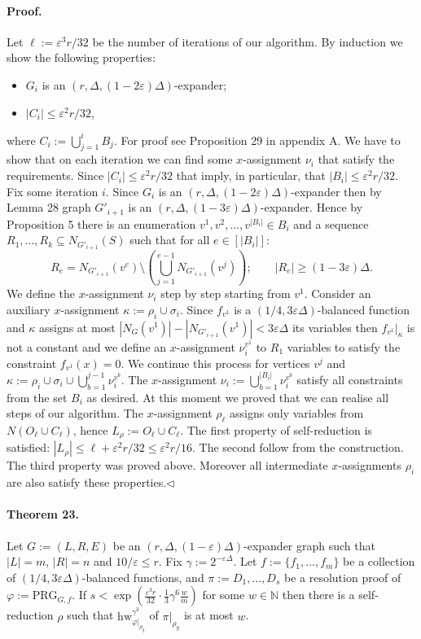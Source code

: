 \paragraph{Proof.} Let $\ell:=\varepsilon^3r/32$ be the number of iterations of our algorithm.
By induction we show the following properties:
\begin{itemize}
\item $G_i$ is an $(r,\Delta,(1-2\varepsilon)\Delta)$-expander;
\item $|C_i|\leq\varepsilon^2r/32$,
\end{itemize}
where $C_i:=\bigcup_{j=1}^iB_j$. For proof see Proposition 29 in appendix A.
We have to show that on each iteration we can find some $x$-assignment $\nu_i$ that satisfy the requirements. Since $|C_i|\leq\varepsilon^2r/32$ that imply, in particular, that $|B_i|\leq\varepsilon^2r/32$.
Fix some iteration $i$. Since $G_i$ is an $(r,\Delta,(1-2\varepsilon)\Delta)$-expander then by Lemma 28 graph $G'_{i+1}$ is an $(r,\Delta,(1-3\varepsilon)\Delta)$-expander. Hence by Proposition 5 there is an enumeration $v^1,v^2,\ldots,v^{|B_i|}\in B_i$ and a sequence $R_1,\ldots,R_k\subseteq N_{G'_{i+1}}(S)$ such that for all $e\in[|B_i|]$:
\[R_e=N_{G'_{i+1}}(v^e)\setminus\left(\bigcup_{j=1}^{e-1}N_{G'_{i+1}}(v^j)\right);\qquad|R_e|\geq(1-3\varepsilon)\Delta.\]
We define the $x$-assignment $\nu_i$ step by step starting from $v^1$. Consider an auxiliary $x$-assignment $\kappa:=\rho_i\cup\sigma_i$. Since $f_{v^1}$ is a $(1/4,3\varepsilon\Delta)$-balanced function and $\kappa$ assigns at most $|N_G(v^1)|-|N_{G'_{i+1}}(v^1)|<3\varepsilon\Delta$ its variables then $f_{v^1}|_\kappa$ is not a constant and we define an $x$-assignment $\nu_i^{v^1}$ to $R_1$ variables to satisfy the constraint $f_{v^1}(x)=0$. We continue this process for vertices $v^j$ and $\kappa:=\rho_i\cup\sigma_i\cup\bigcup_{b=1}^{j-1}\nu_i^{v^b}$. The $x$-assignment $\nu_i:=\bigcup_{b=1}^{|B_i|}\nu_i^{v^b}$ satisfy all constraints from the set $B_i$ as desired.
At this moment we proved that we can realise all steps of our algorithm. The $x$-assignment $\rho_\ell$ assigns only variables from $N(O_\ell\cup C_\ell)$, hence $L_\rho:=O_\ell\cup C_\ell$. The first property of self-reduction is satisfied: $|L_\rho|\leq\ell+\varepsilon^2r/32\leq\varepsilon^2r/16$. The second follow from the construction. The third property was proved above. Moreover all intermediate $x$-assignments $\rho_i$ are also satisfy these properties.\hfill$\triangleleft$
\paragraph{Theorem 23.} Let $G:=(L,R,E)$ be an $(r,\Delta,(1-\varepsilon)\Delta)$-expander graph such that $|L|=m$, $|R|=n$ and $10/\varepsilon\leq r$. Fix $\gamma:=2^{-\varepsilon\Delta}$. Let $f:=\{f_1,\ldots,f_m\}$ be a collection of $(1/4,3\varepsilon\Delta)$-balanced functions, and $\pi:=D_1,\ldots,D_s$ be a resolution proof of $\varphi:=\mathrm{PRG}_{G,f}$.
If $s<\exp(\frac{\varepsilon^3r}{32}\cdot\frac13\gamma^6\frac wm)$ for some $w\in\mathbb N$ then there is a self-reduction $\rho$ such that $\mathrm{hw}_{\varphi|_{\rho_y}}^{\gamma^3}$ of $\pi|_{\rho_y}$ is at most $w$.
